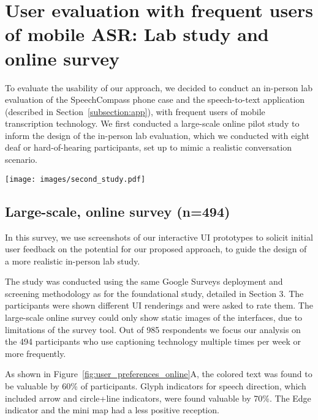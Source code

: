 \section{User evaluation with frequent users of mobile ASR: Lab study and online survey }
To evaluate the usability of our approach, we decided to conduct an in-person lab evaluation of the SpeechCompass phone case and the speech-to-text application (described in Section~\ref{subsection:app}), with frequent users of mobile transcription technology. We first conducted a large-scale online pilot study to inform the design of the in-person lab evaluation, which we conducted with eight deaf or hard-of-hearing participants, set up to mimic a realistic conversation scenario. 

\begin{figure*}
  \centering
  \texttt{[image: images/second\_study.pdf]}
  \caption{Participants' preferences for different visualization techniques in the online survey. A) Results indicating how valuable the specific indicator would be for the user. B) Preferences for the specific indicators for speech direction.} 
  \label{fig:user_preferences_online} 
\end{figure*}


\subsection{Large-scale, online survey (n=494)} In this survey, we use screenshots of our interactive UI prototypes to solicit initial user
feedback on the potential for our proposed approach, to guide the design of a more realistic in-person lab study.

The study was conducted using the same Google Surveys deployment and screening methodology as for the foundational study, detailed in Section 3. The participants were shown different UI renderings and were asked to rate them. The large-scale online survey could only show static images of the interfaces, due to limitations of the survey tool. Out of 985 respondents we focus our analysis on the 494 participants who use captioning technology multiple times per week or more frequently. 

As shown in Figure~\ref{fig:user_preferences_online}A, the colored text was found to be valuable by 60\% of participants. Glyph indicators for speech direction, which included arrow and circle+line indicators, were found valuable by 70\%. The Edge indicator and the mini map had a less positive reception. 

